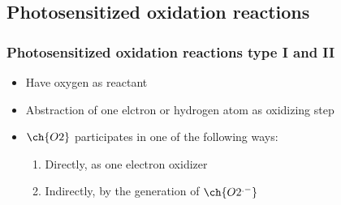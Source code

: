 \documentclass[aspectratio=169,fleqn,table]{beamer}
\begin{document}
\begingroup
{}
\subsection{Photosensitized oxidation reactions}
\begin{frame}
\frametitle{Photosensitized oxidation reactions type I and II}
  
\begin{itemize}
	\item
	Have oxygen as reactant
    \item
    Abstraction of one elctron or hydrogen atom as oxidizing step
    \item
    $\ch{O2}$ participates in one of the following ways:
    \begin{enumerate}
    	\item
    	Directly, as one electron oxidizer
        \item
        Indirectly, by the generation of $\ch{O2^{.-}}$
    \end{enumerate}
\end{itemize}
    
\end{frame}
\endgroup
\end{document}
